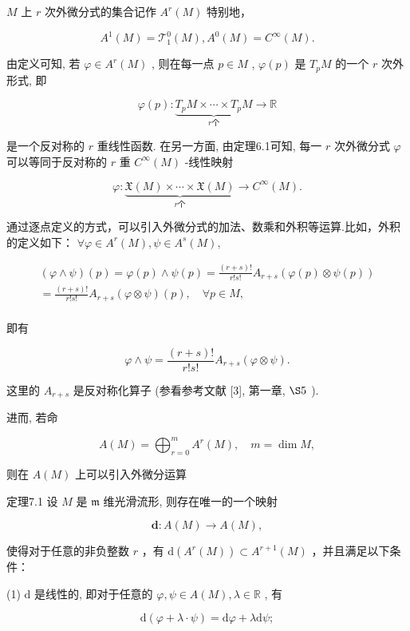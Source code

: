 $M$  上  $r$  次外微分式的集合记作  $A^r (M)$  特别地，

$$
A ^ {1} (M) = \mathcal {T} _ {1} ^ {0} (M), A ^ {0} (M) = C ^ {\infty} (M).
$$

由定义可知, 若  $\varphi \in A^{r}(M)$ , 则在每一点  $p \in M$ ,  $\varphi(p)$  是  $T_{p}M$  的一个  $r$  次外形式, 即

$$
\varphi (p): \underbrace {T _ {p} M \times \cdots \times T _ {p} M} _ {r   \text {个}} \to \mathbb {R}
$$

是一个反对称的  $r$  重线性函数. 在另一方面, 由定理6.1可知, 每一 $r$  次外微分式  $\varphi$  可以等同于反对称的  $r$  重  $C^\infty (M)$  -线性映射

$$
\varphi : \underbrace {\mathfrak {X} (M) \times \cdots \times \mathfrak {X} (M)} _ {r   \text {个}} \to C ^ {\infty} (M).
$$

通过逐点定义的方式，可以引入外微分式的加法、数乘和外积等运算.比如，外积的定义如下：  $\forall \varphi \in A^{r}(M),\psi \in A^{s}(M),$

$$
\begin{array}{l} (\varphi \wedge \psi) (p) = \varphi (p) \wedge \psi (p) = \frac {(r + s) !}{r ! s !} A _ {r + s} (\varphi (p) \otimes \psi (p)) \\ = \frac {(r + s) !}{r ! s !} A _ {r + s} (\varphi \otimes \psi) (p), \quad \forall p \in M, \\ \end{array}
$$

即有

$$
\varphi \wedge \psi = \frac {(r + s) !}{r ! s !} A _ {r + s} (\varphi \otimes \psi).
$$

这里的  $A_{r + s}$  是反对称化算子 (参看参考文献 [3], 第一章,  $\S 5$ ).

进而, 若命

$$
A (M) = \bigoplus_ {r = 0} ^ {m} A ^ {r} (M), \quad m = \dim M,
$$

则在  $A(M)$  上可以引入外微分运算

定理7.1 设  $M$  是  $\mathfrak{m}$  维光滑流形, 则存在唯一的一个映射

$$
\mathbf {d}: A (M) \rightarrow A (M),
$$

使得对于任意的非负整数  $r$ ，有  $\mathrm{d}(A^r (M))\subset A^{r + 1}(M)$ ，并且满足以下条件：

(1)  $\mathrm{d}$  是线性的, 即对于任意的  $\varphi, \psi \in A(M), \lambda \in \mathbb{R}$ , 有

$$
\mathrm {d} (\varphi + \lambda \cdot \psi) = \mathrm {d} \varphi + \lambda \mathrm {d} \psi ;
$$

